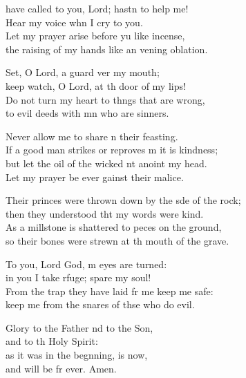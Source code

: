 \settowidth{\versewidth}{Their princes were thrown down by the side of the rock; *}
\begin{psalmverse}%
\begin{patverse}
 have called to you, Lord; hastn to help me!\Med\\
    Hear my voice whn I cry to you.\\
Let my prayer arise before yu like incense,\Med\\
    the raising of my hands like an vening oblation.

Set, O Lord, a guard ver my mouth;\Med\\
    keep watch, O Lord, at th door of my lips!\\
Do not turn my heart to th\pointup{\i}ngs that are wrong,\Med\\
    to evil deeds with mn who are sinners.

Never allow me to share \pointup{\i}n their feasting.\Med\\
    If a good man strikes or reproves m it is kindness;\\
but let the oil of the wicked nt anoint my head.\Med\\
    Let my prayer be ever gainst their malice.

Their princes were thrown down by the s\pointup{\i}de of the rock;\Med\\
    then they understood tht my words were kind.\\
As a millstone is shattered to p\pointup{\i}eces on the ground,\Med\\
    so their bones were strewn at th mouth of the grave.

To you, Lord God, m eyes are turned:\Med\\
    in you I take rfuge; spare my soul!\\
From the trap they have laid fr me keep me safe:\Med\\
    keep me from the snares of thse who do evil.

Glory to the Father nd to the Son,\Med\\
    and to th Holy Spirit:\\
as it was in the beg\pointup{\i}nning, is now,\Med\\
and will be fr ever. Amen.
\end{patverse}
\end{psalmverse}
